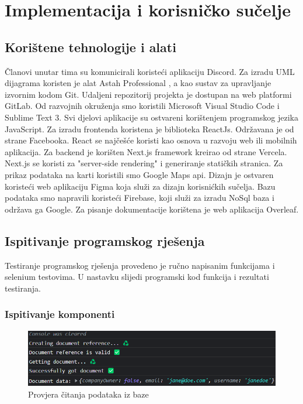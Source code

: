 \chapter{Implementacija i korisničko sučelje}
		
		
		\section{Korištene tehnologije i alati}
		
			
			
			Članovi unutar tima su komunicirali koristeći aplikaciju Discord. 
			Za izradu UML dijagrama koristen je alat Astah Professional
			, a kao sustav za upravljanje
			izvornim kodom Git. Udaljeni repozitorij projekta je dostupan na web platformi
			GitLab. Od razvojnih okruženja smo koristili Microsoft Visual Studio Code i Sublime Text 3. Svi djelovi aplikacije su ostvareni korištenjem programskog jezika JavaScript. Za izradu frontenda koristena je biblioteka ReactJs. Održavana je od strane Facebooka. React se najčešće koristi kao osnova  u razvoju web ili mobilnih aplikacija. Za backend je korišten Next.js framework kreirao od strane Vercela. Next.js se koristi za "server-side rendering" i generiranje statičkih stranica. Za prikaz podataka na karti koristili smo Google Maps api. Dizajn je ostvaren koristeći web aplikaciju Figma koja služi za dizajn korisnićkih sučelja. Bazu podataka smo napravili koristeći Firebase, koji služi za izradu NoSql baza i održava ga Google. Za pisanje dokumentacije korištena je web aplikacija Overleaf.
            \eject 
			
	
		\section{Ispitivanje programskog rješenja}

			
			 Testiranje programskog rješenja provedeno je ručno napisanim funkcijama i selenium testovima. U nastavku slijedi programski kod funkcija i rezultati testiranja.
	
			
			\subsection{Ispitivanje komponenti}
   
		  \begin{figure}[H]
			\includegraphics[scale=0.6]{slike/provjera citanja baze.png}
			\centering
			\caption{Provjera čitanja podataka iz baze}
			\label{fig:promjene}
		          \end{figure}

